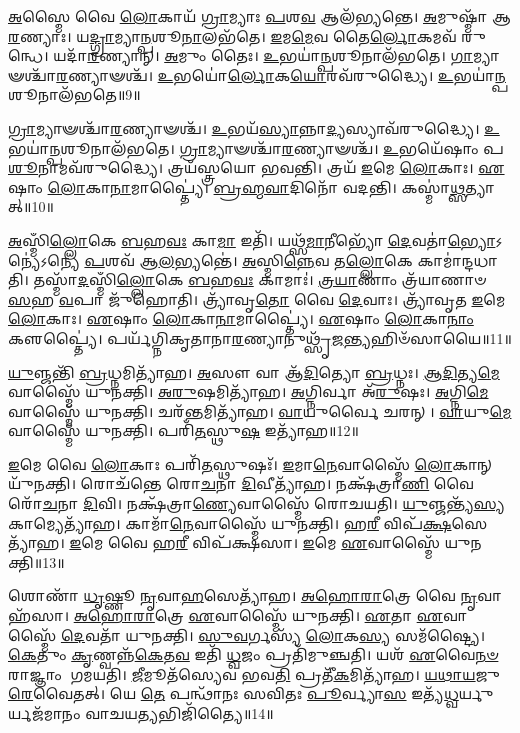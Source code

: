\-\ul{𑌅}\-𑌸𑍍𑌮𑍈 𑌵𑍈 \ul{𑌲𑍋}\-𑌕𑌾𑌯᳴ \ul{𑌗𑍍𑌰𑌾}\-𑌮𑍍𑌯𑌾𑌃 \ul{𑌪}\-𑌶\-\ul{𑌵} 𑌆𑌲᳴𑌭𑍍𑌯𑌨𑍍𑌤𑍇।
\-\ul{𑌅}\-𑌮𑍁𑌷𑍍𑌮𑌾᳴ 𑌆\-\ul{𑌰}\-𑌣𑍍𑌯𑌾𑌃।
𑌯\-\ul{𑌦𑍍𑌗𑍍𑌰𑌾}\-𑌮𑍍𑌯𑌾\-\ul{𑌨𑍍𑌪}\-𑌶𑍂\-\ul{𑌨𑌾}\-𑌲𑌭᳴𑌤𑍇।
\-\ul{𑌇}\-𑌮\-\ul{𑌮𑍇}\-𑌵 𑌤𑍈\-\ul{𑌰𑍍𑌲𑍋}\-𑌕𑌮𑌵᳴ 𑌰𑍁𑌨𑍍𑌧𑍇।
𑌯𑌦𑌾᳴\-\ul{𑌰}\-𑌣𑍍𑌯𑌾𑌨𑍍।
\-\ul{𑌅}\-𑌮𑍁𑌂 𑌤𑍈𑌃।
\-\ul{𑌉}\-𑌭𑌯𑌾॑\-\ul{𑌨𑍍𑌪}\-𑌶𑍂𑌨𑌾𑌲᳴𑌭𑌤𑍇।
\-\ul{𑌗𑌾}\-𑌮𑍍𑌯𑌾𑍟𑌶𑍍𑌚𑌾᳴\-\ul{𑌰}\-𑌣𑍍𑌯𑌾𑍟𑌶𑍍𑌚᳴।
\-\ul{𑌉}\-𑌭𑌯𑍋॑\-\ul{𑌰𑍍𑌲𑍋}\-𑌕\-\ul{𑌯𑍋}\-𑌰𑌵᳴𑌰𑍁𑌦𑍍𑌧𑍍𑌯𑍈।
\-\ul{𑌉}\-𑌭𑌯𑌾॑\-\ul{𑌨𑍍𑌪}\-𑌶𑍂𑌨𑌾\-𑌲᳴𑌭𑌤𑍇॥9॥

\-\ul{𑌗𑍍𑌰𑌾}\-𑌮𑍍𑌯𑌾𑍟𑌶𑍍𑌚𑌾᳴\-\ul{𑌰}\-𑌣𑍍𑌯𑌾𑍟𑌶𑍍𑌚᳴।
\-\ul{𑌉}\-𑌭𑌯᳴\-\ul{𑌸𑍍𑌯𑌾}\-𑌨𑍍𑌨𑌾\-\ul{𑌦𑍍𑌯}\-𑌸𑍍𑌯𑌾𑌵᳴𑌰𑍁𑌦𑍍𑌧𑍍𑌯𑍈।
\-\ul{𑌉}\-𑌭𑌯𑌾॑\-\ul{𑌨𑍍𑌪}\-𑌶𑍂\-𑌨𑌾𑌲᳴𑌭𑌤𑍇।
\-\ul{𑌗𑍍𑌰𑌾}\-𑌮𑍍𑌯𑌾𑍟𑌶𑍍𑌚𑌾᳴\-\ul{𑌰}\-𑌣𑍍𑌯𑌾𑍟𑌶𑍍𑌚᳴।
\-\ul{𑌉}\-𑌭𑌯𑍇᳴𑌷𑌾𑌂 𑌪\-\ul{𑌶𑍂}\-𑌨𑌾𑌮𑌵᳴𑌰𑍁𑌦𑍍𑌧𑍍𑌯𑍈।
𑌤𑍍𑌰𑌯᳴𑌸𑍍𑌤𑍍𑌰𑌯𑍋 𑌭𑌵𑌨𑍍𑌤𑌿।
𑌤𑍍𑌰𑌯᳴ \ul{𑌇}\-𑌮𑍇 \ul{𑌲𑍋}\-𑌕𑌾𑌃।
\-\ul{𑌏}\-𑌷𑌾𑌂 \ul{𑌲𑍋}\-𑌕𑌾\-\ul{𑌨𑌾}\-𑌮𑌾𑌪𑍍𑌤𑍍𑌯𑍈॑।
\-\ul{𑌬𑍍𑌰}\-\-\ul{𑌹𑍍𑌮}\-\-\ul{𑌵𑌾}\-𑌦𑌿𑌨𑍋᳴ 𑌵𑌦𑌨𑍍𑌤𑌿।
𑌕𑌸𑍍𑌮𑌾॑\-\ul{𑌥𑍍𑌸}\-𑌤𑍍𑌯𑌾𑌤𑍍॥10॥

\-\ul{𑌅}\-𑌸𑍍𑌮𑌿𑌁\-\ul{𑌲𑍍𑌲𑍋}\-𑌕𑍇 \ul{𑌬}\-𑌹\-\ul{𑌵𑌃} 𑌕𑌾\-\ul{𑌮𑌾} 𑌇𑌤𑌿᳴।
𑌯𑌥𑍍𑌸᳴\-\ul{𑌮𑌾}\-𑌨𑍀𑌭𑍍𑌯𑍋᳴ \ul{𑌦𑍇}\-𑌵𑌤𑌾॑\-\ul{𑌭𑍍𑌯𑍋}\-\-𑌽𑌨𑍍𑌯𑍇॑\-𑌽𑌨𑍍𑌯𑍇 \ul{𑌪}\-𑌶𑌵᳴ 𑌆\-\ul{𑌲}\-𑌭𑍍𑌯𑌨𑍍𑌤𑍇॑।
\-\ul{𑌅}\-𑌸𑍍𑌮𑌿\-\ul{𑌨𑍍𑌨𑍇}\-𑌵 𑌤\-\ul{𑌲𑍍𑌲𑍋}\-𑌕𑍇 𑌕𑌾𑌮𑌾॑𑌨𑍍𑌦𑌧𑌾𑌤𑌿।
𑌤𑌸𑍍𑌮𑌾᳴\-\ul{𑌦}\-𑌸𑍍𑌮𑌿𑌁\-\ul{𑌲𑍍𑌲𑍋}\-𑌕𑍇 \ul{𑌬}\-𑌹\-\ul{𑌵𑌃} 𑌕𑌾𑌮𑌾𑌃॑।
\-\ul{𑌤𑍍𑌰}\-\-\ul{𑌯𑌾}\-𑌣𑌾𑌂 𑌤𑍍𑌰᳴𑌯𑌾𑌣𑌾𑍞 \ul{𑌸}\-𑌹 \ul{𑌵}\-𑌪𑌾 𑌜𑍁᳴𑌹𑍋𑌤𑌿।
𑌤𑍍𑌰𑍍𑌯𑌾᳴𑌵𑍃\-\ul{𑌤𑍋} 𑌵𑍈 \ul{𑌦𑍇}\-𑌵𑌾𑌃।
𑌤𑍍𑌰𑍍𑌯𑌾᳴𑌵𑍃𑌤 \ul{𑌇}\-𑌮𑍇 \ul{𑌲𑍋}\-𑌕𑌾𑌃।
\-\ul{𑌏}\-𑌷𑌾𑌂 \ul{𑌲𑍋}\-𑌕𑌾\-\ul{𑌨𑌾}\-𑌮𑌾𑌪𑍍𑌤𑍍𑌯𑍈॑।
\-\ul{𑌏}\-𑌷𑌾𑌂 \ul{𑌲𑍋}\-𑌕𑌾\-\ul{𑌨𑌾𑌂} 𑌕𑍢𑌪𑍍𑌤𑍍𑌯𑍈॑।
𑌪𑌰𑍍𑌯᳴𑌗𑍍𑌨𑌿𑌕𑍃𑌤𑌾𑌨𑌾\-\ul{𑌰}\-𑌣𑍍𑌯𑌾\-𑌨𑍁𑌥𑍍𑌸𑍃᳴\-\ul{𑌜}\-𑌨𑍍𑌤𑍍𑌯𑌹𑌿𑍞᳴𑌸𑌾𑌯𑍈॥11॥\anuvakamend[𑌅𑌵᳴𑌰𑍁𑌦𑍍𑌧𑍍𑌯𑌾 \ul{𑌉}\-𑌭𑌯𑌾॑\-\ul{𑌨𑍍𑌪}\-𑌶𑍂𑌨𑌾𑌲᳴𑌭𑌤𑍇 \ul{𑌸}\-𑌤𑍍𑌯𑌾𑌦𑌹𑌿𑍞᳴𑌸𑌾𑌯𑍈]

\-\ul{𑌯𑍁}\-𑌞𑍍𑌜𑌨𑍍𑌤𑌿᳴ \ul{𑌬𑍍𑌰}\-𑌧𑍍𑌨𑌮𑌿𑌤𑍍𑌯𑌾᳴𑌹।
\-\ul{𑌅}\-𑌸𑍗 𑌵𑌾 𑌆᳴\-\ul{𑌦𑌿}\-𑌤𑍍𑌯𑍋 \ul{𑌬𑍍𑌰}\-𑌧𑍍𑌨𑌃।
\-\ul{𑌆}\-\-\ul{𑌦𑌿}\-𑌤𑍍𑌯\-\ul{𑌮𑍇}\-𑌵𑌾𑌸𑍍𑌮𑍈᳴ 𑌯𑍁𑌨𑌕𑍍𑌤𑌿।
\-\ul{𑌅}\-\-\ul{𑌰𑍁}\-𑌷𑌮𑌿𑌤𑍍𑌯𑌾᳴𑌹।
\-\ul{𑌅}\-𑌗𑍍𑌨𑌿𑌰𑍍𑌵𑌾 𑌅᳴\-\ul{𑌰𑍁}\-𑌷𑌃।
\-\ul{𑌅}\-𑌗𑍍𑌨𑌿\-\ul{𑌮𑍇}\-𑌵𑌾𑌸𑍍𑌮𑍈᳴ 𑌯𑍁𑌨𑌕𑍍𑌤𑌿।
𑌚𑌰᳴\-\ul{𑌨𑍍𑌤}\-𑌮𑌿𑌤𑍍𑌯𑌾᳴𑌹।
\-\ul{𑌵𑌾}\-𑌯𑍁𑌰𑍍𑌵𑍈 𑌚𑌰𑌨𑍍।
\-\ul{𑌵𑌾}\-𑌯𑍁\-\ul{𑌮𑍇}\-𑌵𑌾𑌸𑍍𑌮𑍈᳴ 𑌯𑍁𑌨𑌕𑍍𑌤𑌿।
𑌪𑌰𑌿᳴\-\ul{𑌤}\-𑌸𑍍𑌥𑍁\-\ul{𑌷} 𑌇𑌤𑍍𑌯𑌾᳴𑌹॥12॥

\-\ul{𑌇}\-𑌮𑍇 𑌵𑍈 \ul{𑌲𑍋}\-𑌕𑌾𑌃 𑌪𑌰𑌿᳴\-\ul{𑌤}\-𑌸𑍍𑌥𑍁𑌷𑌃᳴।
\-\ul{𑌇}\-𑌮𑌾\-\ul{𑌨𑍇}\-𑌵𑌾𑌸𑍍𑌮𑍈᳴ \ul{𑌲𑍋}\-𑌕𑌾𑌨𑍍 𑌯𑍁᳴𑌨𑌕𑍍𑌤𑌿।
𑌰𑍋𑌚᳴𑌨𑍍𑌤𑍇 𑌰𑍋\-\ul{𑌚}\-𑌨𑌾 \ul{𑌦𑌿}\-𑌵𑍀𑌤𑍍𑌯𑌾᳴𑌹।
𑌨𑌕𑍍𑌷᳴𑌤𑍍𑌰𑌾\-\ul{𑌣𑌿} 𑌵𑍈 𑌰𑍋᳴\-\ul{𑌚}\-𑌨𑌾 \ul{𑌦𑌿}\-𑌵𑌿।
𑌨𑌕𑍍𑌷᳴𑌤𑍍𑌰𑌾\-\ul{𑌣𑍍𑌯𑍇}\-𑌵𑌾𑌸𑍍𑌮𑍈᳴ 𑌰𑍋𑌚𑌯𑌤𑌿।
\-\ul{𑌯𑍁}\-𑌞𑍍𑌜𑌨𑍍𑌤𑍍𑌯᳴\-\ul{𑌸𑍍𑌯} 𑌕𑌾𑌮𑍍𑌯𑍇𑌤𑍍𑌯𑌾᳴𑌹।
𑌕𑌾𑌮𑌾᳴\-\ul{𑌨𑍇}\-𑌵𑌾𑌸𑍍𑌮𑍈᳴ 𑌯𑍁𑌨𑌕𑍍𑌤𑌿।
𑌹\-\ul{𑌰𑍀} 𑌵𑌿𑌪᳴\-\ul{𑌕𑍍𑌷}\-𑌸𑍇𑌤𑍍𑌯𑌾᳴𑌹।
\-\ul{𑌇}\-𑌮𑍇 𑌵𑍈 𑌹\-\ul{𑌰𑍀} 𑌵𑌿𑌪᳴𑌕𑍍𑌷𑌸𑌾।
\-\ul{𑌇}\-𑌮𑍇 \ul{𑌏}\-𑌵𑌾𑌸𑍍𑌮𑍈᳴ 𑌯𑍁𑌨𑌕𑍍𑌤𑌿॥13॥

𑌶𑍋𑌣𑌾᳴ \ul{𑌧𑍃}\-𑌷𑍍𑌣𑍂 \ul{𑌨𑍃}\-𑌵𑌾\-\ul{𑌹}\-𑌸𑍇𑌤𑍍𑌯𑌾᳴𑌹।
\-\ul{𑌅}\-\-\ul{𑌹𑍋}\-\-\ul{𑌰𑌾}\-𑌤𑍍𑌰𑍇 𑌵𑍈 \ul{𑌨𑍃}\-𑌵𑌾𑌹᳴𑌸𑌾।
\-\ul{𑌅}\-\-\ul{𑌹𑍋}\-\-\ul{𑌰𑌾}\-𑌤𑍍𑌰𑍇 \ul{𑌏}\-𑌵𑌾𑌸𑍍𑌮𑍈᳴ 𑌯𑍁𑌨𑌕𑍍𑌤𑌿।
\-\ul{𑌏}\-𑌤𑌾 \ul{𑌏}\-𑌵𑌾𑌸𑍍𑌮𑍈᳴ \ul{𑌦𑍇}\-𑌵𑌤𑌾᳴ 𑌯𑍁𑌨𑌕𑍍𑌤𑌿।
\-\ul{𑌸𑍁}\-\-\ul{𑌵}\-𑌰𑍍𑌗𑌸𑍍𑌯᳴ \ul{𑌲𑍋}\-𑌕\-\ul{𑌸𑍍𑌯} 𑌸𑌮᳴𑌷𑍍𑌟𑍍𑌯𑍈।
\-\ul{𑌕𑍇}\-𑌤𑍁𑌂 \ul{𑌕𑍃}\-𑌣𑍍𑌵𑌨𑍍𑌨᳴\-\ul{𑌕𑍇}\-𑌤\-\ul{𑌵} 𑌇𑌤𑌿᳴ \ul{𑌧𑍍𑌵}\-𑌜𑌂 𑌪𑍍𑌰𑌤𑌿᳴\-𑌮𑍁𑌞𑍍𑌚𑌤𑌿।
𑌯𑌶᳴ \ul{𑌏}\-𑌵𑍈\-\ul{𑌨}\-\-\ul{𑍞} 𑌰𑌾𑌜𑍍𑌞𑌾𑌂 𑌗𑌮𑌯𑌤𑌿।
\-\ul{𑌜𑍀}\-𑌮𑍂𑌤᳴𑌸𑍍𑌯𑍇𑌵 𑌭𑌵\-\ul{𑌤𑌿} 𑌪𑍍𑌰𑌤𑍀᳴\-\ul{𑌕}\-𑌮𑌿𑌤𑍍𑌯𑌾᳴𑌹।
\-\ul{𑌯}\-\-\ul{𑌥𑌾}\-\-\ul{𑌯}\-𑌜𑍁\-\ul{𑌰𑍇}\-𑌵𑍈𑌤𑌤𑍍।
𑌯𑍇 \ul{𑌤𑍇} 𑌪𑌨𑍍𑌥𑌾᳴𑌨𑌃 𑌸𑌵𑌿𑌤𑌃 \ul{𑌪𑍂}\-𑌰𑍍𑌵𑍍𑌯𑌾\-\ul{𑌸} 𑌇𑌤𑍍𑌯᳴\-\ul{𑌧𑍍𑌵}\-𑌰𑍍𑌯𑍁𑌰𑍍𑌯𑌜᳴𑌮𑌾𑌨𑌂 𑌵𑌾𑌚𑌯\-\ul{𑌤𑍍𑌯}\-𑌭𑌿𑌜𑌿᳴𑌤𑍍𑌯𑍈॥14॥

